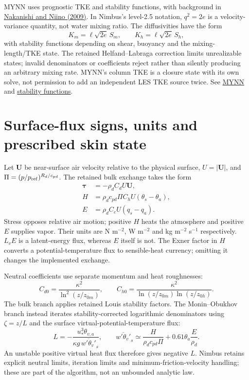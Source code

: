 MYNN uses prognostic TKE and stability functions, with background in
\href{https://www.jstage.jst.go.jp/article/jmsj/87/5/87_5_895/_article/-char/en}{Nakanishi
and Niino (2009)}. In Nimbus's level-2.5 notation, $q^2=2e$ is a velocity-variance
quantity, not water mixing ratio. The diffusivities have the form
\[
 K_m=\ell\sqrt{2e}\,S_m,
 \qquad K_h=\ell\sqrt{2e}\,S_h,
\]
with stability functions depending on shear, buoyancy and the mixing-length/TKE
state. The retained Helfand--Labraga correction limits unrealizable states;
invalid denominators or coefficients reject rather than silently producing
an arbitrary mixing rate. MYNN's column TKE is a closure state with its own
solve, not permission to add an independent LES TKE source twice. See
\href{../src/boundary_layer/schemes/mynn/mynn.cpp}{MYNN} and
\href{../src/boundary_layer/schemes/mynn/mynn_stability.cpp}{stability functions}.

\section{Surface-flux signs, units and prescribed skin state}

Let $\boldsymbol U$ be near-surface air velocity relative to the physical
surface, $U=|\boldsymbol U|$, and $\Pi=(p/p_{\rm ref})^{R_d/c_{pd}}$.
The retained bulk exchange takes the form
\[
\begin{aligned}
 \boldsymbol\tau&=-\rho_dC_dU\boldsymbol U,\\
 H&=\rho_dc_{pd}\Pi C_hU(\theta_s-\theta_a),\\
 E&=\rho_dC_eU(q_s-q_a).
\end{aligned}
\]
Stress opposes relative air motion; positive $H$ heats the atmosphere and
positive $E$ supplies vapor. Their units are N m$^{-2}$, W m$^{-2}$ and
kg m$^{-2}$ s$^{-1}$ respectively. $L_vE$ is a latent-energy flux, whereas $E$
itself is not. The Exner factor in $H$ converts a potential-temperature flux
to sensible-heat currency; omitting it changes the implemented exchange.

Neutral coefficients use separate momentum and heat roughnesses:
\[
 C_{d0}=\frac{\kappa^2}{\ln^2(z/z_{0m})},\qquad
 C_{h0}=\frac{\kappa^2}{\ln(z/z_{0m})\ln(z/z_{0h})}.
\]
The bulk branch applies retained Louis stability factors. The Monin--Obukhov
branch instead iterates stability-corrected logarithmic denominators using
$\zeta=z/L$ and the surface virtual-potential-temperature flux:
\[
 L=-\frac{u_*^3\theta_{v,a}}
          {\kappa g\,\overline{w'\theta_v'}_s},\qquad
 \overline{w'\theta_v'}_s\simeq
 \frac{H}{\rho_dc_{pd}\Pi}+0.61\theta_a\frac{E}{\rho_d}.
\]
An unstable positive virtual heat flux therefore gives negative $L$. Nimbus
retains explicit neutral limits, iteration limits and minimum-friction-velocity
handling; these are part of the algorithm, not an unbounded analytic law.

